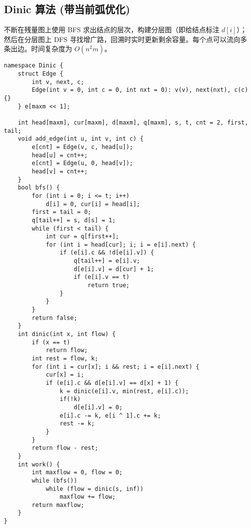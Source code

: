 \subsection{Dinic 算法 (带当前弧优化)}
\par 不断在残量图上使用 BFS 求出结点的层次，构建分层图（即给结点标注 $d[i]$）；然后在分层图上 DFS 寻找增广路，回溯时实时更新剩余容量。每个点可以流向多条出边。时间复杂度为 $O(n^2m)$。
\begin{verbatim}
namespace Dinic {
    struct Edge {
        int v, next, c;
        Edge(int v = 0, int c = 0, int nxt = 0): v(v), next(nxt), c(c) {}
    } e[maxm << 1];
    
    int head[maxm], cur[maxm], d[maxm], q[maxm], s, t, cnt = 2, first, tail;
    void add_edge(int u, int v, int c) {
        e[cnt] = Edge(v, c, head[u]);
        head[u] = cnt++;
        e[cnt] = Edge(u, 0, head[v]);
        head[v] = cnt++;
    }
    bool bfs() {
        for (int i = 0; i <= t; i++)
            d[i] = 0, cur[i] = head[i];
        first = tail = 0;
        q[tail++] = s, d[s] = 1;
        while (first < tail) {
            int cur = q[first++];
            for (int i = head[cur]; i; i = e[i].next) {
                if (e[i].c && !d[e[i].v]) {
                    q[tail++] = e[i].v;
                    d[e[i].v] = d[cur] + 1;
                    if (e[i].v == t)
                        return true;
                }
            }
        }
        return false;
    }
    int dinic(int x, int flow) {
        if (x == t)
            return flow;
        int rest = flow, k;
        for (int i = cur[x]; i && rest; i = e[i].next) {
            cur[x] = i;
            if (e[i].c && d[e[i].v] == d[x] + 1) {
                k = dinic(e[i].v, min(rest, e[i].c));
                if(!k)
                    d[e[i].v] = 0;
                e[i].c -= k, e[i ^ 1].c += k;
                rest -= k;
            }
        }
        return flow - rest;
    }
    int work() {
        int maxflow = 0, flow = 0;
        while (bfs()) 
            while (flow = dinic(s, inf))
                maxflow += flow;
        return maxflow;
    }
}
\end{verbatim}

\clearpage